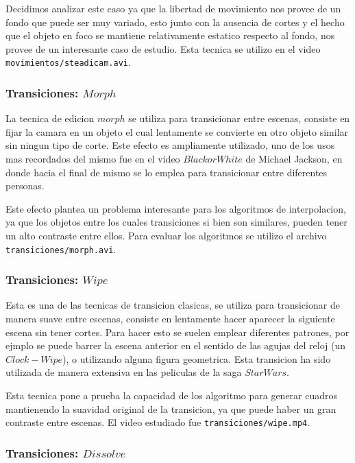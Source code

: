 Decidimos analizar este caso ya que la libertad de movimiento nos provee de un fondo que puede ser muy variado, esto junto con la ausencia de cortes y el hecho que el objeto en foco se mantiene relativamente estatico respecto al fondo, nos provee de un interesante caso de estudio. Esta tecnica se utilizo en el video \texttt{movimientos/steadicam.avi}.

\subsubsection{Transiciones: $Morph$}

La tecnica de edicion $morph$ se utiliza para transicionar entre escenas, consiste en fijar la camara en un objeto el cual lentamente se convierte en otro objeto similar sin ningun tipo de corte. Este efecto es ampliamente utilizado, uno de los usos mas recordados del mismo fue en el video $Black or White$ de Michael Jackson, en donde hacia el final de mismo se lo emplea para transicionar entre diferentes personas.

Este efecto plantea un problema interesante para los algoritmos de interpolacion, ya que los objetos entre los cuales transiciones si bien son similares, pueden tener un alto contraste entre ellos. Para evaluar los algoritmos se utilizo el archivo \texttt{transiciones/morph.avi}.

\subsubsection{Transiciones: $Wipe$}

Esta es una de las tecnicas de transicion clasicas, se utiliza para transicionar de manera suave entre escenas, consiste en lentamente hacer aparecer la siguiente escena sin tener cortes. Para hacer esto se suelen emplear diferentes patrones, por ejmplo se puede barrer la escena anterior en el sentido de las agujas del reloj (un $Clock-Wipe$), o utilizando alguna figura geometrica. Esta transicion ha sido utilizada de manera extensiva en las peliculas de la saga $Star Wars$.

Esta tecnica pone a prueba la capacidad de los algoritmo para generar cuadros mantienendo la suavidad original de la transicion, ya que puede haber un gran contraste entre escenas. El video estudiado fue \texttt{transiciones/wipe.mp4}.

\subsubsection{Transiciones: $Dissolve$}

